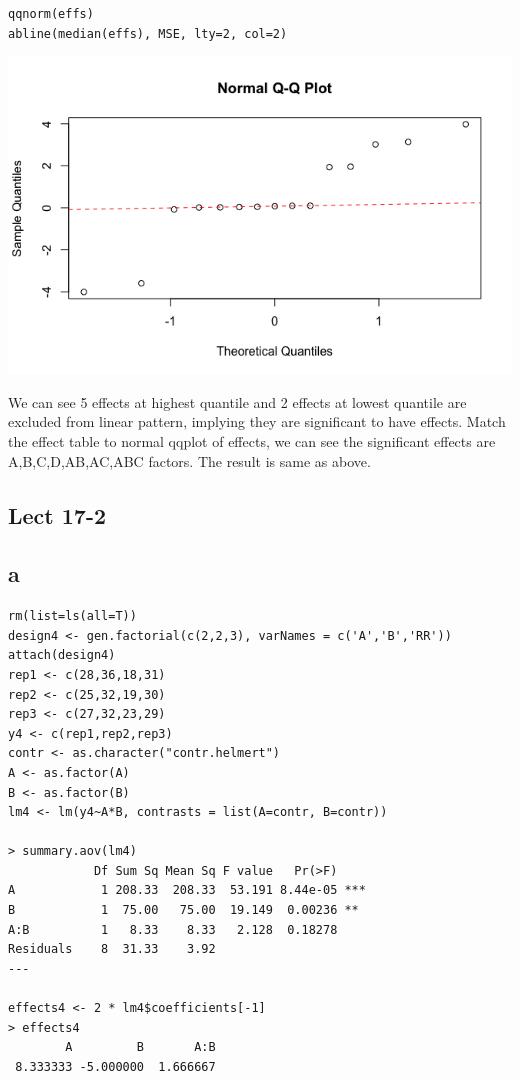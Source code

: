 \documentclass[11pt,letterpaper]{article}
\begin{document}
\begin{verbatim}
qqnorm(effs)
abline(median(effs), MSE, lty=2, col=2)
\end{verbatim}
\includegraphics[scale=0.55]{lect-16-4-e.png}

\noindent  We can see 5 effects at highest quantile and 2 effects at lowest quantile are excluded from linear pattern, implying they are significant to have effects. Match the effect table to normal qqplot of effects, we can see the significant effects are A,B,C,D,AB,AC,ABC factors. The result is same as above. 

\newpage
\subsection*{Lect 17-2}
\subsection*{a}
\begin{verbatim}
rm(list=ls(all=T))
design4 <- gen.factorial(c(2,2,3), varNames = c('A','B','RR'))
attach(design4)
rep1 <- c(28,36,18,31)
rep2 <- c(25,32,19,30)
rep3 <- c(27,32,23,29)
y4 <- c(rep1,rep2,rep3)
contr <- as.character("contr.helmert")
A <- as.factor(A)
B <- as.factor(B)
lm4 <- lm(y4~A*B, contrasts = list(A=contr, B=contr))

> summary.aov(lm4)
            Df Sum Sq Mean Sq F value   Pr(>F)    
A            1 208.33  208.33  53.191 8.44e-05 ***
B            1  75.00   75.00  19.149  0.00236 ** 
A:B          1   8.33    8.33   2.128  0.18278    
Residuals    8  31.33    3.92                     
---

effects4 <- 2 * lm4$coefficients[-1]
> effects4
        A         B       A:B 
 8.333333 -5.000000  1.666667 
\end{verbatim}
\end{document}
